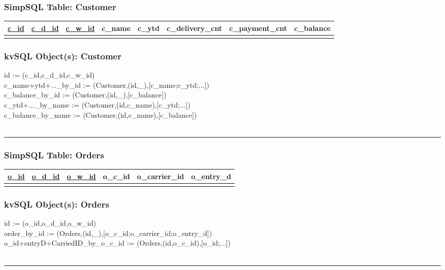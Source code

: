 \documentclass[12pt,letter]{article}
\begin{document}
\subsubsection*{SimpSQL Table: Customer}  
\begin{tabular}{ |c|c|c|c|c|c|c|c| }
 \hline
 \underline{c\_id} & \underline{c\_d\_id} & \underline{c\_w\_id} &
 c\_name & c\_ytd &
 c\_delivery\_cnt & c\_payment\_cnt & c\_balance\\
 \hline
 &   &   & & & & &\\
 \hline
\end{tabular}

\subsubsection*{kvSQL Object(s): Customer}  
id := (c\_id,c\_d\_id,c\_w\_id) \\
 c\_name+ytd+...\_by\_id := 
(Customer,(id,\_),[c\_name;c\_ytd;...])  \\
 c\_balance\_by\_id := 
(Customer,(id,\_),[c\_balance])  \\
 c\_ytd+...\_by\_name := 
(Customer,(id,c\_name),[c\_ytd;...])  \\
 c\_balance\_by\_name := 
(Customer,(id,c\_name),[c\_balance])  \\
\\
\hrule

\subsubsection*{SimpSQL Table: Orders}  
\begin{tabular}{ |c|c|c|c|c|c| }
 \hline
 \underline{o\_id} & \underline{o\_d\_id} & \underline{o\_w\_id} &
 o\_c\_id & o\_carrier\_id & o\_entry\_d\\
 \hline
 &   &   & & &\\
 \hline
\end{tabular}

\subsubsection*{kvSQL Object(s): Orders}  
id := (o\_id,o\_d\_id,o\_w\_id) \\
order\_by\_id := 
(Orders,(id,\_),[o\_c\_id;o\_carrier\_id;o\_entry\_d])  \\
o\_id+entryD+CarriedID\_by\_o\_c\_id := 
(Orders,(id,o\_c\_id),[o\_id;...])  \\
\\ 
\hrule
\end{document}
